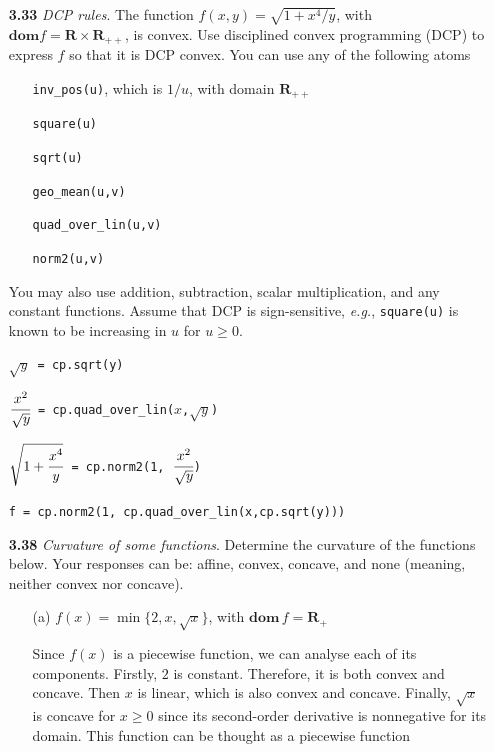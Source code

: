 \documentclass[11pt,a4paper]{article}
\begin{document}
\begin{itemize}
    \item[\textbf{3.33}] \textit{DCP rules}. The function $f(x,y) = \sqrt{1 + x^4/y}$, with $\textbf{dom} f = \mathbf{R}\times\mathbf{R}_{++}$, is convex. Use disciplined convex programming (DCP) to express $f$ so that it is DCP convex. You can use any of the following atoms
    \item[]\begin{itemize}
        \item[] \texttt{inv\_pos(u)}, which is $1/u$, with domain $\mathbf{R}_{++}$
        \item[] \texttt{square(u)}
        \item[] \texttt{sqrt(u)}
        \item[] \texttt{geo\_mean(u,v)}
        \item[] \texttt{quad\_over\_lin(u,v)}
        \item[] \texttt{norm2(u,v)}
    \end{itemize}

    You may also use addition, subtraction, scalar multiplication, and any constant functions. Assume that DCP is sign-sensitive, \textit{e.g.}, \texttt{square(u)} is known to be increasing in $u$ for $u \geq 0$.

    \texttt{$\sqrt{y}$ =  cp.sqrt(y)}

    \texttt{$\cfrac{x^2}{\sqrt{y}}$  =  cp.quad\_over\_lin($x$,$\sqrt{y}$)}

    \texttt{$\sqrt{1 + \cfrac{x^4}{y}}$ = cp.norm2(1, $\cfrac{x^2}{\sqrt{y}}$)} 

    \texttt{f  = cp.norm2(1, cp.quad\_over\_lin(x,cp.sqrt(y)))}

    \item[\textbf{3.38}] \textit{Curvature of some functions}. Determine the curvature of the functions below. Your responses can be: affine, convex, concave, and none (meaning, neither convex nor concave).
    \item[] \begin{itemize}
        \item[(a)] $f(x) = \min\{2,x,\sqrt{x}\}$, with $\textbf{dom}\, f = \mathbf{R}_+$
        
        Since $f(x)$ is a piecewise function, we can analyse each of its components. Firstly, $2$ is constant. Therefore, it is both convex and concave. Then $x$ is linear, which is also convex and concave. Finally, $\sqrt{x}$ is concave for $x \geq 0$ since its second-order derivative is nonnegative for its domain. This function can be thought as a piecewise function


\end{itemize}
\end{itemize}
\end{document}
